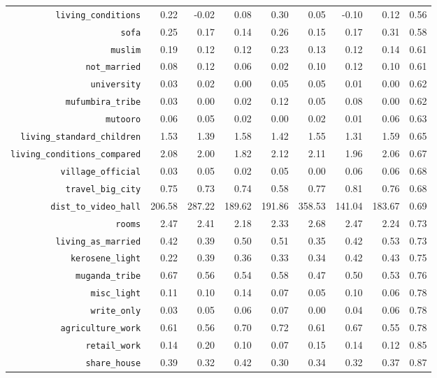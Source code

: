 \begin{longtable}{rrrrrrrrr}
  {\texttt{living\_conditions}} & 0.22 & -0.02 & 0.08 & 0.30 & 0.05 & -0.10 & 0.12 & 0.56 \\ 
  {\texttt{sofa}} & 0.25 & 0.17 & 0.14 & 0.26 & 0.15 & 0.17 & 0.31 & 0.58 \\ 
  {\texttt{muslim}} & 0.19 & 0.12 & 0.12 & 0.23 & 0.13 & 0.12 & 0.14 & 0.61 \\ 
  {\texttt{not\_married}} & 0.08 & 0.12 & 0.06 & 0.02 & 0.10 & 0.12 & 0.10 & 0.61 \\ 
  {\texttt{university}} & 0.03 & 0.02 & 0.00 & 0.05 & 0.05 & 0.01 & 0.00 & 0.62 \\ 
  {\texttt{mufumbira\_tribe}} & 0.03 & 0.00 & 0.02 & 0.12 & 0.05 & 0.08 & 0.00 & 0.62 \\ 
  {\texttt{mutooro}} & 0.06 & 0.05 & 0.02 & 0.00 & 0.02 & 0.01 & 0.06 & 0.63 \\ 
  {\texttt{living\_standard\_children}} & 1.53 & 1.39 & 1.58 & 1.42 & 1.55 & 1.31 & 1.59 & 0.65 \\ 
  {\texttt{living\_conditions\_compared}} & 2.08 & 2.00 & 1.82 & 2.12 & 2.11 & 1.96 & 2.06 & 0.67 \\ 
  {\texttt{village\_official}} & 0.03 & 0.05 & 0.02 & 0.05 & 0.00 & 0.06 & 0.06 & 0.68 \\ 
  {\texttt{travel\_big\_city}} & 0.75 & 0.73 & 0.74 & 0.58 & 0.77 & 0.81 & 0.76 & 0.68 \\ 
  {\texttt{dist\_to\_video\_hall}} & 206.58 & 287.22 & 189.62 & 191.86 & 358.53 & 141.04 & 183.67 & 0.69 \\ 
  {\texttt{rooms}} & 2.47 & 2.41 & 2.18 & 2.33 & 2.68 & 2.47 & 2.24 & 0.73 \\ 
  {\texttt{living\_as\_married}} & 0.42 & 0.39 & 0.50 & 0.51 & 0.35 & 0.42 & 0.53 & 0.73 \\ 
  {\texttt{kerosene\_light}} & 0.22 & 0.39 & 0.36 & 0.33 & 0.34 & 0.42 & 0.43 & 0.75 \\ 
  {\texttt{muganda\_tribe}} & 0.67 & 0.56 & 0.54 & 0.58 & 0.47 & 0.50 & 0.53 & 0.76 \\ 
  {\texttt{misc\_light}} & 0.11 & 0.10 & 0.14 & 0.07 & 0.05 & 0.10 & 0.06 & 0.78 \\ 
  {\texttt{write\_only}} & 0.03 & 0.05 & 0.06 & 0.07 & 0.00 & 0.04 & 0.06 & 0.78 \\ 
  {\texttt{agriculture\_work}} & 0.61 & 0.56 & 0.70 & 0.72 & 0.61 & 0.67 & 0.55 & 0.78 \\ 
  {\texttt{retail\_work}} & 0.14 & 0.20 & 0.10 & 0.07 & 0.15 & 0.14 & 0.12 & 0.85 \\ 
  {\texttt{share\_house}} & 0.39 & 0.32 & 0.42 & 0.30 & 0.34 & 0.32 & 0.37 & 0.87 \\ 

\end{longtable}
